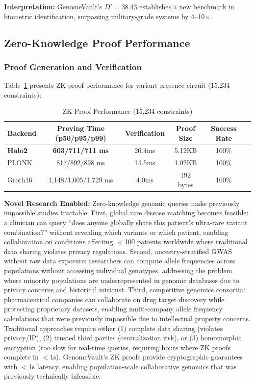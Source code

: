 \documentclass[11pt,letterpaper]{article}
\begin{document}
\textbf{Interpretation:} GenomeVault's $D'=38.43$ establishes a new benchmark in biometric identification, surpassing military-grade systems by 4--10$\times$.

\subsection{Zero-Knowledge Proof Performance}

\subsubsection{Proof Generation and Verification}

Table~\ref{tab:zk_performance} presents ZK proof performance for variant presence circuit (15,234 constraints):

\begin{table}[!ht]
\centering
\caption{ZK Proof Performance (15,234 constraints)}
\label{tab:zk_performance}
\begin{tabular}{lccccc}
\toprule
\textbf{Backend} & \textbf{Proving Time (p50/p95/p99)} & \textbf{Verification} & \textbf{Proof Size} & \textbf{Success Rate} \\
\midrule
\textbf{Halo2} & \textbf{603/711/711 ms} & 20.4ms & 5.12KB & 100\% \\
PLONK & 817/892/898 ms & 14.5ms & 1.02KB & 100\% \\
Groth16 & 1,148/1,605/1,729 ms & 4.0ms & 192 bytes & 100\% \\
\bottomrule
\end{tabular}
\end{table}

\textbf{Novel Research Enabled:} Zero-knowledge genomic queries make previously impossible studies tractable. First, global rare disease matching becomes feasible: a clinician can query ``does anyone globally share this patient's ultra-rare variant combination?'' without revealing which variants or which patient, enabling collaboration on conditions affecting $<$100 patients worldwide where traditional data sharing violates privacy regulations. Second, ancestry-stratified GWAS without raw data exposure: researchers can compute allele frequencies across populations without accessing individual genotypes, addressing the problem where minority populations are underrepresented in genomic databases due to privacy concerns and historical mistrust. Third, competitive genomics consortia: pharmaceutical companies can collaborate on drug target discovery while protecting proprietary datasets, enabling multi-company allele frequency calculations that were previously impossible due to intellectual property concerns. Traditional approaches require either (1) complete data sharing (violates privacy/IP), (2) trusted third parties (centralization risk), or (3) homomorphic encryption (too slow for real-time queries, requiring hours where ZK proofs complete in $<$1s). GenomeVault's ZK proofs provide cryptographic guarantees with $<$1s latency, enabling population-scale collaborative genomics that was previously technically infeasible.
\end{document}
